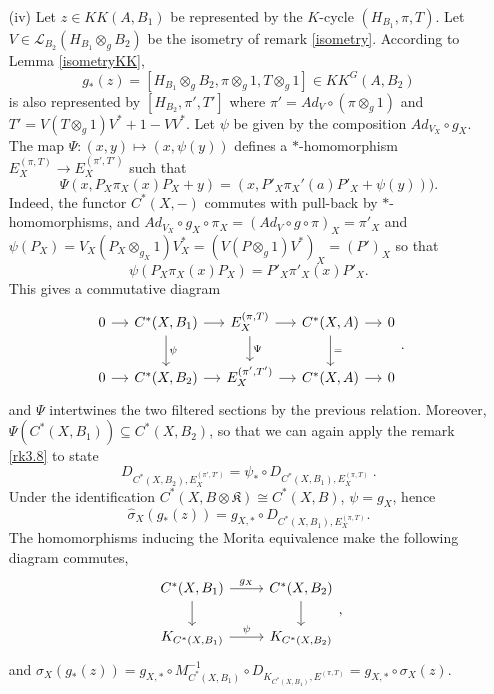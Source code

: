 \begin{dem}
\begin{enumerate}

\item[(iv)]
Let $z \in KK(A,B_1)$ be represented by the $K$-cycle $(H_{B_1},\pi,T)$. Let $V\in \mathcal L_{B_2}(H_{B_1}\otimes_g B_2)$ be the isometry of remark \ref{isometry}. According to Lemma \ref{isometryKK}, 
\[g_*(z)=[H_{B_1}\otimes_g B_2, \pi\otimes_g 1, T\otimes_g 1]\in KK^G(A,B_2)\] 
is also represented by $[H_{B_2}, \pi',T' ]$ where $\pi' = Ad_{V}\circ (\pi\otimes_g 1)$ and $T' = V(T\otimes_g 1)V^* +1-VV^*$. Let $\psi$ be given by the composition $Ad_{V_X}\circ g_X$.\\
The map $\Psi :(x,y)\mapsto (x, \psi(y))$ defines a $*$-homomorphism $E_X^{(\pi,T)} \rightarrow E_X^{(\pi',T')}$ such that 
\[\Psi(x,P_X\pi_X(x)P_X +y)= (x, P'_X  \pi_X'(a)P'_X + \psi(y)) ).\] 
Indeed, the functor $C^*(X,-)$ commutes with pull-back by $*$-homomorphisms, and $Ad_{V_X}\circ g_X\circ\pi_X= (Ad_V\circ g \circ \pi)_X = \pi'_X$ and $\psi(P_X)= V_X (P_X\otimes_{g_X} 1)V^*_X = (V(P\otimes_g 1 ) V^*)_X = (P')_X$ so that 
\[\psi(P_X \pi_X(x) P_X)=P'_X \pi'_X(x) P'_X. \]
This gives a commutative diagram 
\[\begin{tikzcd}[column sep = small]
0\arrow{r} & C^*(X,B_1)\arrow{r}\arrow{d}{\psi} & E_X^{(\pi,T)} \arrow{r}\arrow{d}{\Psi}& C^*(X,A)\arrow{r}\arrow{d}{=} & 0\\
0\arrow{r} & C^*(X,B_2)\arrow{r} & E_X^{(\pi',T')} \arrow{r}& C^*(X,A)\arrow{r} & 0
\end{tikzcd}.\]
and $\Psi$ intertwines the two filtered sections by the previous relation. Moreover, $\Psi (C^*(X,B_1))\subseteq C^*(X,B_2)$, so that we can again apply the remark \ref{rk3.8} to state
\[ D_{C^*(X,B_2),E_X^{(\pi',T')}}=\psi_*\circ D_{C^*(X,B_1),E_X^{(\pi,T)}}\ .\]
Under the identification $C^*(X,B\otimes\mathfrak K) \cong C^*(X,B)$, $\psi = g_X$, hence
\[\hat\sigma_X(g_*(z)) = g_{X,*}\circ D_{C^*(X,B_1),E_X^{(\pi,T)}}.\]
The homomorphisms inducing the Morita equivalence make the following diagram commutes,
\[\begin{tikzcd}C^*(X,B_1)\arrow{r}{g_X}\arrow{d} & C^*(X,B_2)\arrow{d} \\ K_{C^*(X,B_1) } \arrow{r}{\psi}& K_{C^*(X,B_2)}\end{tikzcd},\]
and $\sigma_X(g_*(z))= g_{X,*}\circ M_{C^*(X,B_1)}^{-1}\circ D_{K_{C^*(X,B_1)},E^{(\pi,T)}}=g_{X,*}\circ \sigma_X(z)$.\\


\end{enumerate}
\end{dem}
